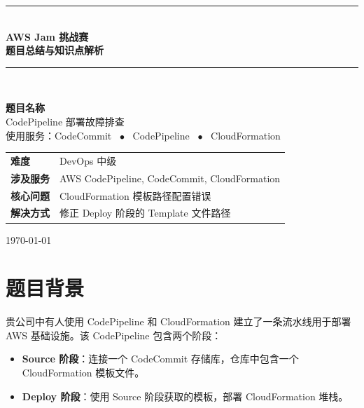 \documentclass[12pt, a4paper]{article}
\begin{document}
\begin{titlepage}
  \centering
  \vspace*{2cm}
  {\color{awsorange}\rule{\linewidth}{3pt}}\\[0.5cm]
  {\Huge\bfseries\color{awsdark} AWS Jam 挑战赛}\\[0.3cm]
  {\Large\bfseries\color{awsdark} 题目总结与知识点解析}\\[0.3cm]
  {\color{awsorange}\rule{\linewidth}{3pt}}\\[1.5cm]

  \begin{mdframed}[backgroundcolor=codegray, linecolor=awsorange, linewidth=1.5pt]
    \centering
    \vspace{0.5cm}
    {\large\bfseries 题目名称}\\[0.3cm]
    {\Large CodePipeline 部署故障排查}\\[0.3cm]
    {\normalsize 使用服务：CodeCommit \ $\bullet$ \ CodePipeline \ $\bullet$ \ CloudFormation}
    \vspace{0.5cm}
  \end{mdframed}

  \vspace{2cm}
  \begin{tabular}{ll}
    \textbf{难度} & DevOps 中级 \\[0.3cm]
    \textbf{涉及服务} & AWS CodePipeline, CodeCommit, CloudFormation \\[0.3cm]
    \textbf{核心问题} & CloudFormation 模板路径配置错误 \\[0.3cm]
    \textbf{解决方式} & 修正 Deploy 阶段的 Template 文件路径 \\
  \end{tabular}

  \vfill
  {\color{gray}\today}
\end{titlepage}

\tableofcontents
\newpage


\section{题目背景}

贵公司中有人使用 CodePipeline 和 CloudFormation 建立了一条流水线用于部署 AWS 基础设施。该 CodePipeline 包含两个阶段：

\begin{itemize}[leftmargin=2em]
  \item \textbf{Source 阶段}：连接一个 CodeCommit 存储库，仓库中包含一个 CloudFormation 模板文件。
  \item \textbf{Deploy 阶段}：使用 Source 阶段获取的模板，部署 CloudFormation 堆栈。
\end{itemize}
\end{document}
